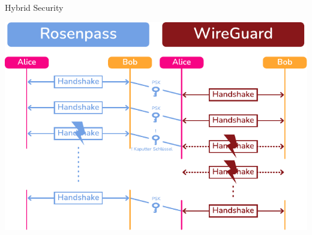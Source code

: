 \begin{frame}{Hybrid Security}
\hypertarget{hybrid-security-with-wireguard}{}
\centering

  \includegraphics[height=.85\textheight]{graphics/rpwg.pdf}

\end{frame}


%


